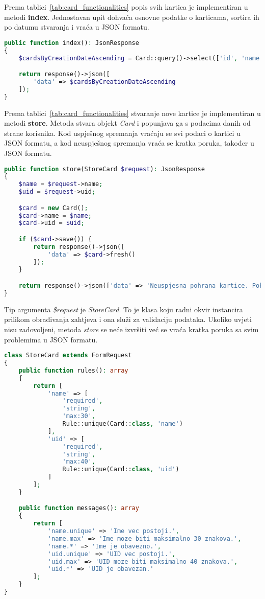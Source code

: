 Prema tablici~\ref{tab:card_functionalities} popis svih kartica je implementiran u metodi \textbf{index}.
Jednostavan upit dohvaća osnovne podatke o karticama, sortira ih po datumu stvaranja i vraća u JSON formatu.

\begin{lstlisting}[language=PHP]
public function index(): JsonResponse
{
    $cardsByCreationDateAscending = Card::query()->select(['id', 'name', 'uid'])->orderBy('created_at')->get();

    return response()->json([
        'data' => $cardsByCreationDateAscending
    ]);
}
\end{lstlisting}

Prema tablici~\ref{tab:card_functionalities} stvaranje nove kartice je implementiran u metodi \textbf{store}.
Metoda stvara objekt \textit{Card} i popunjava ga s podacima danih od strane korisnika.
Kod uspješnog spremanja vraćaju se svi podaci o kartici u JSON formatu, a kod neuspješnog spremanja vraća se kratka poruka,
također u JSON formatu.

\begin{lstlisting}[language=PHP]
public function store(StoreCard $request): JsonResponse
{
    $name = $request->name;
    $uid = $request->uid;

    $card = new Card();
    $card->name = $name;
    $card->uid = $uid;

    if ($card->save()) {
        return response()->json([
            'data' => $card->fresh()
        ]);
    }

    return response()->json(['data' => 'Neuspjesna pohrana kartice. Pokusajte ponovo!']);
}
\end{lstlisting}

Tip argumenta \textit{\$request} je \textit{StoreCard}.
To je klasa koju radni okvir instancira prilikom obrađivanja zahtjeva i ona služi za validaciju podataka.
Ukoliko uvjeti nisu zadovoljeni, metoda \textit{store} se neće izvršiti već se vraća kratka poruka sa svim problemima u
JSON formatu.

\begin{lstlisting}[language=PHP]
class StoreCard extends FormRequest
{
    public function rules(): array
    {
        return [
            'name' => [
                'required',
                'string',
                'max:30',
                Rule::unique(Card::class, 'name')
            ],
            'uid' => [
                'required',
                'string',
                'max:40',
                Rule::unique(Card::class, 'uid')
            ]
        ];
    }

    public function messages(): array
    {
        return [
            'name.unique' => 'Ime vec postoji.',
            'name.max' => 'Ime moze biti maksimalno 30 znakova.',
            'name.*' => 'Ime je obavezno.',
            'uid.unique' => 'UID vec postoji.',
            'uid.max' => 'UID moze biti maksimalno 40 znakova.',
            'uid.*' => 'UID je obavezan.'
        ];
    }
}
\end{lstlisting}

